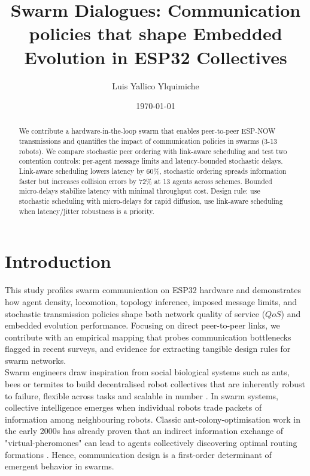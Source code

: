 \documentclass[conference]{IEEEtran}
\title{Swarm Dialogues: Communication policies that shape Embedded Evolution in ESP32 Collectives}
\author{Luis Yallico Ylquimiche}
\date{\today}
\begin{document}
\maketitle
\pagestyle{plain}

\begin{abstract}
We contribute a hardware-in-the-loop swarm that enables peer-to-peer ESP-NOW transmissions and quantifies the impact of communication policies in swarms (3-13 robots). We compare stochastic peer ordering with link-aware scheduling and test two contention controls: per-agent message limits and latency-bounded stochastic delays. Link-aware scheduling lowers latency by 60\%, stochastic ordering spreads information faster but increases collision errors by 72\% at 13 agents across schemes. Bounded micro-delays stabilize latency with minimal throughput cost. Design rule: use stochastic scheduling with micro-delays for rapid diffusion, use link-aware scheduling when latency/jitter robustness is a priority.
\end{abstract}


\section{Introduction}

This study profiles swarm communication on ESP32 hardware and demonstrates how agent density, locomotion, topology inference, imposed message limits, and stochastic transmission policies shape both network quality of service ($QoS$) and embedded evolution performance. Focusing on direct peer-to-peer links, we contribute with an empirical mapping that probes communication bottlenecks flagged in recent surveys, and evidence for extracting tangible design rules for swarm networks. \\

Swarm engineers draw inspiration from social biological systems such as ants, bees or termites to build decentralised robot collectives that are inherently robust to failure, flexible across tasks and scalable in number \cite{hamann_swarm_2018}. In swarm systems, collective intelligence emerges when individual robots trade packets of information among neighbouring robots. Classic ant-colony-optimisation work in the early 2000s has already proven that an indirect information exchange of "virtual-pheromones" can lead to agents collectively discovering optimal routing formations \cite{dorigo_ant_2000}. Hence, communication design is a first-order determinant of emergent behavior in swarms. \\
\end{document}
